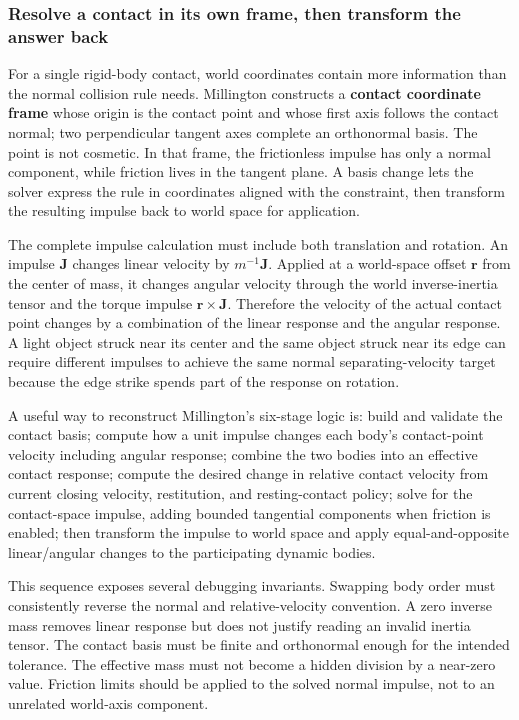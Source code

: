 \subsubsection{Resolve a contact in its own frame, then transform the answer back}\label{06-engine-ii-ch046-resolve-a-contact-in-its-own-frame-then-transform-the-answer-back}

For a single rigid-body contact, world coordinates contain more information than the normal collision rule needs. Millington constructs a \textbf{contact coordinate frame} whose origin is the contact point and whose first axis follows the contact normal; two perpendicular tangent axes complete an orthonormal basis. The point is not cosmetic. In that frame, the frictionless impulse has only a normal component, while friction lives in the tangent plane. A basis change lets the solver express the rule in coordinates aligned with the constraint, then transform the resulting impulse back to world space for application.

The complete impulse calculation must include both translation and rotation. An impulse \(\mathbf{J}\) changes linear velocity by \(m^{-1}\mathbf{J}\). Applied at a world-space offset \(\mathbf{r}\) from the center of mass, it changes angular velocity through the world inverse-inertia tensor and the torque impulse \(\mathbf{r}\times\mathbf{J}\). Therefore the velocity of the actual contact point changes by a combination of the linear response and the angular response. A light object struck near its center and the same object struck near its edge can require different impulses to achieve the same normal separating-velocity target because the edge strike spends part of the response on rotation.

A useful way to reconstruct Millington's six-stage logic is: build and validate the contact basis; compute how a unit impulse changes each body's contact-point velocity including angular response; combine the two bodies into an effective contact response; compute the desired change in relative contact velocity from current closing velocity, restitution, and resting-contact policy; solve for the contact-space impulse, adding bounded tangential components when friction is enabled; then transform the impulse to world space and apply equal-and-opposite linear/angular changes to the participating dynamic bodies.

This sequence exposes several debugging invariants. Swapping body order must consistently reverse the normal and relative-velocity convention. A zero inverse mass removes linear response but does not justify reading an invalid inertia tensor. The contact basis must be finite and orthonormal enough for the intended tolerance. The effective mass must not become a hidden division by a near-zero value. Friction limits should be applied to the solved normal impulse, not to an unrelated world-axis component.

